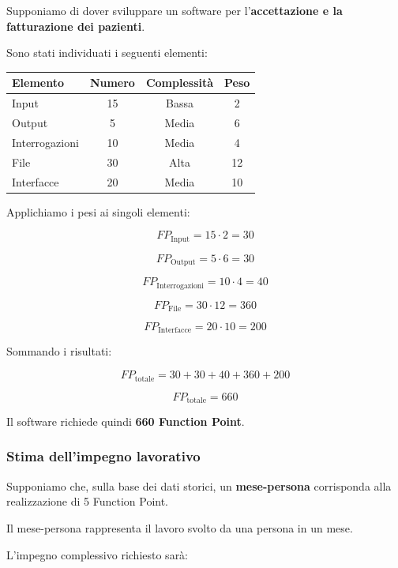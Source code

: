 \noindent Supponiamo di dover sviluppare un software
per l'\textbf{accettazione e la fatturazione dei pazienti}.

\medskip

\noindent Sono stati individuati i seguenti elementi:

\begin{center}
\begin{tabular}{|l|c|c|c|}
\hline
\textbf{Elemento} &
\textbf{Numero} &
\textbf{Complessità} &
\textbf{Peso} \\
\hline
Input & 15 & Bassa & 2 \\
\hline
Output & 5 & Media & 6 \\
\hline
Interrogazioni & 10 & Media & 4 \\
\hline
File & 30 & Alta & 12 \\
\hline
Interfacce & 20 & Media & 10 \\
\hline
\end{tabular}
\end{center}

\noindent Applichiamo i pesi ai singoli elementi:

\[
FP_{\text{Input}}=15\cdot2=30
\]

\[
FP_{\text{Output}}=5\cdot6=30
\]

\[
FP_{\text{Interrogazioni}}=10\cdot4=40
\]

\[
FP_{\text{File}}=30\cdot12=360
\]

\[
FP_{\text{Interfacce}}=20\cdot10=200
\]

\noindent Sommando i risultati:

\[
FP_{\text{totale}}
=30+30+40+360+200
\]

\[
\boxed{FP_{\text{totale}}=660}
\]

\noindent Il software richiede quindi
\textbf{660 Function Point}.

\subsubsection*{Stima dell'impegno lavorativo}

\noindent Supponiamo che, sulla base dei dati storici,
un \textbf{mese-persona} corrisponda alla realizzazione
di 5 Function Point.

\medskip

\noindent Il mese-persona rappresenta il lavoro svolto
da una persona in un mese.

\medskip

\noindent L'impegno complessivo richiesto sarà:

